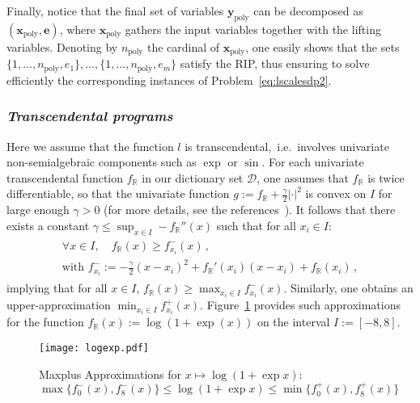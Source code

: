 \documentclass[preprint]{sigplanconf}
\newcommand{\setD}{\mathcal{D}} %
\newcommand{\R}{\mathbb{R}}
\newcommand{\x}{\mathbf{x}}
\newcommand{\e}{\mathbf{e}}
\newcommand{\y}{\mathbf{y}}
\newcommand{\poly}{_\text{poly}}
\theoremstyle{plain}
\begin{document}
Finally, notice that the final set of variables $\y\poly$ can be decomposed as $(\x\poly, \e)$, where $\x\poly$ gathers the input variables together with the lifting variables.  
Denoting by $n\poly$ the cardinal of $\x\poly$, one easily shows that the sets $\{1, \dots, n\poly, e_1\},\dots,\{1, \dots, n\poly, e_m\}$ satisfy the RIP, thus ensuring to solve efficiently the corresponding instances of Problem~\eqref{eq:lscalesdp2}.
%
\subsubsection*{\textit{Transcendental programs}}
Here we assume that the function $l$ is transcendental,~i.e.~involves univariate non-semialgebraic components such as $\exp$ or $\sin$. For each univariate transcendental function $f_{\R}$ in our dictionary set $\setD$, one assumes that $f_{\R}$ is twice differentiable, so that the univariate function $g := f_{\R} + \frac{\gamma}{2} |\cdot|^2$ is convex on $I$ for large enough $\gamma > 0$ (for more details, see the references~\cite{agk04, mceneaney-livre}). It follows that there exists a constant $\gamma \leq \sup_{x\in I} -f_{\R}''(x)$ such that for all $x_i \in I$:
\begin{align}
\begin{split}
\label{eq:maxplus}
\forall x \in I, \quad f_{\R} (x)  \geq f_{x_i}^-(x) \,,\\
\text{with } f_{x_i}^- :=  -\frac{\gamma}{2} (x-x_i)^2 +f_{\R}'(x_i) (x - x_i) + f_{\R} (x_i) \,,
\end{split}
\end{align}
implying that for all $x \in I$, $f_{\R} (x)  \geq \max_{x_i \in I} f_{x_i}^-(x)$. Similarly, one obtains an upper-approximation $\min_{x_i \in I} f_{x_i}^+(x)$.
Figure~\ref{fig:logexp} provides such approximations for the function $f_{\R}(x) := \log (1 + \exp(x))$ on the interval $I := [-8, 8]$.
%
\begin{figure}[!ht]
\begin{center}
\texttt{[image: logexp.pdf]}
\caption{Maxplus Approximations for $x \mapsto \log(1 + \exp{x})$: $\max \{ f_0^- (x), f_8^- (x)\} \leq  \log(1 + \exp{x}) \leq \min \{ f_0^+ (x), f_8^+ (x)\} $}\label{fig:logexp}
\end{center}
\end{figure}
%
\end{document}
